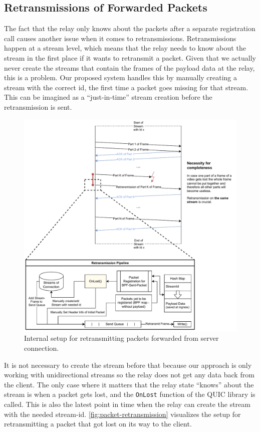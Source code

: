 \subsection{Retransmissions of Forwarded Packets}
The fact that the relay only knows about the packets after a separate registration call causes 
another issue when it comes to retransmissions.
Retransmissions happen at a stream level, which means that the relay needs to know about the 
stream in the first place if it wants to retransmit a packet.
Given that we actually never create the streams that contain the frames of the payload data 
at the relay, this is a problem.
Our proposed system handles this by manually creating a stream with the correct id, the first
time a packet goes missing for that stream.
This can be imagined as a ``just-in-time'' stream creation before the retransmission is sent.

\begin{figure}[H]
    \centering
    \includegraphics[width=\textwidth]{figures/03_fast_relays/retransmission.drawio.pdf}
    \caption[Packet retransmission schematic]{Internal setup for retransmitting packets forwarded from server connection.}\label{fig:packet-retransmission}
\end{figure}

It is not necessary to create the stream before that because our approach is only working with 
unidirectional streams so the relay does not get any data back from the client.
The only case where it matters that the relay state ``knows'' about the stream is when a packet
gets lost, and the \verb|OnLost| function of the QUIC library is called.
This is also the latest point in time when the relay can create the stream with the needed stream-id.
\autoref{fig:packet-retransmission} visualizes the setup for retransmitting a packet that 
got lost on its way to the client. 
